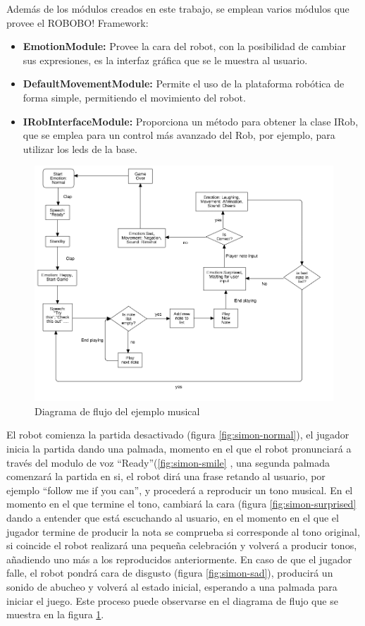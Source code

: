 Además de los módulos creados en este trabajo, se emplean varios módulos que provee el ROBOBO! Framework:

\begin{itemize}
	\item \textbf{EmotionModule:} Provee la cara del robot, con la posibilidad de cambiar sus expresiones, es la interfaz gráfica que se le muestra al usuario.
	\item \textbf{DefaultMovementModule:} Permite el uso de la plataforma robótica de forma simple, permitiendo el movimiento del robot.
	\item \textbf{IRobInterfaceModule:} Proporciona un método para obtener la clase IRob, que se emplea para un control más avanzado del Rob, por ejemplo, para utilizar los leds de la base.
\end{itemize}


\begin{figure}
	\centering
	\includegraphics[width=1.1\linewidth]{imagenes/simon_flowchart.png}
	\caption{Diagrama de flujo del ejemplo musical}
	\label{fig:simon-flowchart}
\end{figure} 


El robot comienza la partida desactivado (figura \ref{fig:simon-normal}), el jugador inicia la partida dando una palmada, momento en el que el robot pronunciará a través del modulo de voz \enquote{Ready}(\ref{fig:simon-smile} , una segunda palmada comenzará la partida en si, el robot dirá una frase retando al usuario, por ejemplo \enquote{follow me if you can}, y procederá a reproducir un tono musical. En el momento en el que termine el tono, cambiará la cara (figura \ref{fig:simon-surprised} dando a entender que está escuchando al usuario, en el momento en el que el jugador termine de producir la nota se comprueba si corresponde al tono original, si coincide el robot realizará una pequeña celebración y volverá a producir tonos, añadiendo uno más a los reproducidos anteriormente. En caso de que el jugador falle, el robot pondrá cara de disgusto (figura \ref{fig:simon-sad}), producirá un sonido de abucheo y volverá al estado inicial, esperando a una palmada para iniciar el juego. Este proceso puede observarse en el diagrama de flujo que se muestra en la figura \ref{fig:simon-flowchart}.

